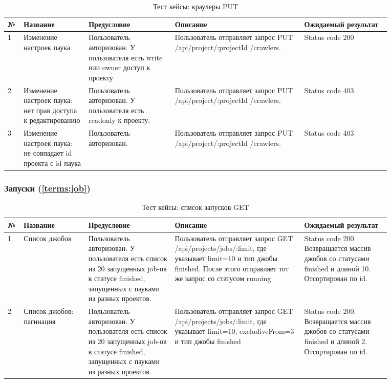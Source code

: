 \documentclass[a4paper,12pt]{article}
\begin{document}
	
	\begin{table}[htb]
		\centering
		\begin{tabular}{|p{0.02\linewidth}|p{0.15\linewidth}|p{0.2\linewidth}|p{0.3\linewidth}|p{0.2\linewidth}|} 
			\hline
			\textbf{№} & \textbf{Название} & \textbf{Предусловие} & \textbf{Описание} & \textbf{Ожидаемый результат} \\ \hline
			1 & Изменение настроек паука & Пользователь авторизован. У пользователя есть write или owner доступ к проекту. & Пользователь отправляет запрос PUT /api/project/:projectId /crawlers. & Status code 200 \\ \hline
			2 & Изменение настроек паука: нет прав доступа к редактированию & Пользователь авторизован. У пользователя есть readonly к проекту. & Пользователь отправляет запрос PUT /api/project/:projectId /crawlers. & Status code 403 \\ \hline
			3 & Изменение настроек паука: не совпадает id проекта с id паука & Пользователь авторизован. & Пользователь отправляет запрос PUT /api/project/:projectId /crawlers. & Status code 403 \\ \hline
	
	\end{tabular}
	\caption{Тест кейсы: краулеры PUT}
	\end{table}
	
	
	\subsubsection{Запуски (\ref{terms:job})}
	
	\begin{table}[H]
		\centering
		\begin{tabular}{|p{0.02\linewidth}|p{0.15\linewidth}|p{0.2\linewidth}|p{0.3\linewidth}|p{0.2\linewidth}|} 
			\hline
			\textbf{№} & \textbf{Название} & \textbf{Предусловие} & \textbf{Описание} & \textbf{Ожидаемый результат} \\ \hline
            1 &  Список джобов  & Пользователь авторизован. У пользователя есть список из 20 запущенных job-ов в статусе finished, запущенных с пауками из разных проектов. & Пользователь отправляет запрос GET      /api/projects/jobs/:limit, где указывает limit=10 и тип джобы finished. После этого отправляет тот же запрос со статусом running
 & Status code 200. Возвращается массив джобов со статусами finished и длиной 10. Отсортирован по id.  \\ \hline
            2 & Список джобов: пагинация & Пользователь авторизован. У пользователя есть список из 20 запущенных job-ов в статусе finished, запущенных с пауками из разных проектов. & Пользователь отправляет запрос GET      /api/projects/jobs/:limit, где указывает limit=10, excludiveFrom=3 и тип джобы finished
 & Status code 200. Возвращается массив джобов со статусами finished и длиной 2. Отсортирован по id. \\ \hline
			
		\end{tabular}
	\caption{Тест кейсы: список запусков GET}
	\end{table} 
	
\end{document}
